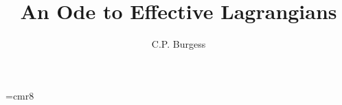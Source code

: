

\font\eightrm=cmr8

%



\def\Journal#1#2#3#4{{#1} {\bf #2}, #3 (#4)}

\def\NCA{\em Nuovo Cimento}
\def\NIM{\em Nucl. Instrum. Methods}
\def\NIMA{{\em Nucl. Instrum. Methods} A}
\def\NPB{{\em Nucl. Phys.} B}
\def\PLB{{\em Phys. Lett.}  B}
\def\PRL{\em Phys. Rev. Lett.}
\def\PRD{{\em Phys. Rev.} D}
\def\ZPC{{\em Z. Phys.} C}

\def\st{\scriptstyle}
\def\sst{\scriptscriptstyle}
\def\pref#1{(\ref{#1})}
\def\mco{\multicolumn}
\def\epp{\epsilon^{\prime}}
\def\vep{\varepsilon}
\def\eps{\epsilon}
\def\Square{{\vbox {\hrule height 0.6pt
        \hbox{\vrule width 0.6pt\hskip 3pt
        \vbox{\vskip 6pt}\hskip 3pt \vrule width 0.6pt}
        \hrule height 0.6pt}}}
\def\ie{{\it i.e.}}
\def\ra{\rightarrow}
\def\ppg{\pi^+\pi^-\gamma}
\def\hf{\frac12}
\def\nth#1{\frac{1}{#1}}
\def\del{\nabla}
\def\vp{{\bf p}}
\def\ko{K^0}
\def\kb{\bar{K^0}}
\def\al{\alpha}
\def\ab{\bar{\alpha}}
\def\be{\begin{equation}}
\def\ee{\end{equation}}
\def\bea{\begin{eqnarray}}
\def\eea{\end{eqnarray}}
\def\CPbar{\hbox{{\rm CP}\hskip-1.80em{/}}}%



\vspace{10mm}
\title{An Ode to Effective Lagrangians}
%
\author{C.P. Burgess}
%
\address{Physics Department, McGill University\\
3600 University Street, Montr\'eal, Qu\'ebec, Canada, H3A 2T8\\
E-mail: cliff@physics.mcgill.ca} 


